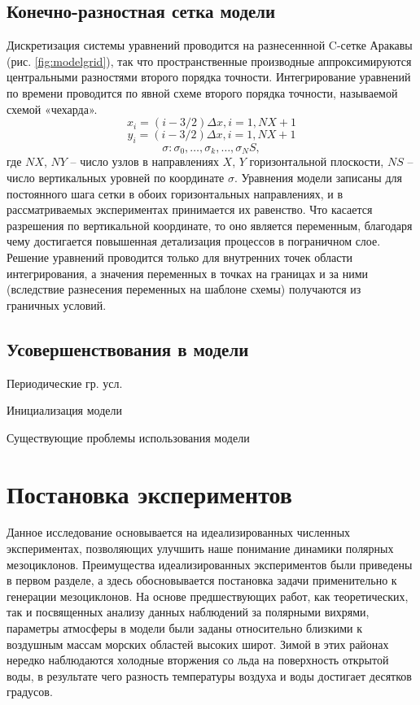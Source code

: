 \documentclass[12pt,a4paper]{report}
\begin{document}
\subsection{Конечно-разностная сетка модели}
Дискретизация системы уравнений проводится на разнесеннной C-сетке Аракавы (рис. \ref{fig:modelgrid}), так что пространственные производные аппроксимируются центральными разностями второго порядка точности. Интегрирование уравнений по времени проводится по явной схеме второго порядка точности, называемой схемой «чехарда».
$$x_i=(i-3/2)\Delta x,i=1,NX+1$$
$$y_i=(i-3/2)\Delta x,i=1,NX+1$$
$$\sigma: \sigma_0, \dots, \sigma_k,\dots,\sigma_NS,$$
где $NX$, $NY$ – число узлов в направлениях $X$, $Y$ горизонтальной плоскости, $NS$ – число вертикальных уровней по координате $\sigma$. Уравнения модели записаны для постоянного шага сетки в обоих горизонтальных направлениях, и в рассматриваемых экспериментах принимается их равенство. Что касается разрешения по вертикальной координате, то оно является переменным, благодаря чему достигается повышенная детализация процессов в пограничном слое. 
Решение уравнений проводится только для внутренних точек области интегрирования, а значения переменных в точках на границах и за ними (вследствие разнесения переменных на шаблоне схемы) получаются из граничных условий.

\subsection{Усовершенствования в модели}
\begin{sqlist}
\item Периодические гр. усл.
\item Инициализация модели
\item Существующие проблемы использования модели
\end{sqlist}

\section{Постановка экспериментов}
\label{sec:expsetup}
Данное исследование основывается на идеализированных численных экспериментах, позволяющих улучшить наше понимание динамики полярных мезоциклонов. Преимущества идеализированных экспериментов были приведены в первом разделе, а здесь обосновывается постановка задачи применительно к генерации мезоциклонов.
На основе предшествующих работ, как теоретических, так и посвященных анализу данных наблюдений за полярными вихрями, параметры атмосферы в модели были заданы относительно близкими к воздушным массам морских областей высоких широт. Зимой в этих районах нередко наблюдаются холодные вторжения со льда на поверхность открытой воды, в результате чего разность температуры воздуха и воды  достигает десятков градусов.
\end{document}

